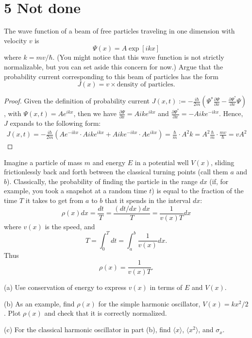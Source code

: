 \documentclass{article}
\begin{document}
\newpage

\section{5 Not done}
\begin{ques}\label{q5}
The wave function of a beam of free particles traveling in one dimension with velocity $v$ is
\[
\Psi(x) = A \exp [ikx]
\]
where $k = mv/\hbar$. (You might notice that this wave function is not strictly normalizable, but
you can set aside this concern for now.) Argue that the probability current corresponding
to this beam of particles has the form
\[
J(x) = v \times \text{density of particles}.
\]
\end{ques}

\begin{proof}
    Given the definition of probability current $J(x,t):=-\frac{i\hbar}{2m}\left(\Psi^*\frac{\partial \Psi}{\partial x}-\frac{\partial \Psi^*}{\partial x}\Psi\right)$, with $\Psi(x,t)=Ae^{ikx}$, then we have $\frac{\partial \Psi}{\partial x}=Aike^{ikx}$ and $\frac{\partial \Psi^*}{\partial x}=-Aike^{-ikx}$. Hence, $J$ expands to the following form:
    \begin{align}
        J(x,t)=-\frac{i\hbar}{2m}\left(Ae^{-ikx}\cdot Aike^{ikx}+Aike^{-ikx}\cdot Ae^{ikx}\right) = \frac{\hbar}{m}\cdot A^2k=A^2\frac{\hbar}{m}\cdot \frac{mv}{\hbar} = vA^2
    \end{align}

\end{proof}

\newpage

\begin{ques}\label{q6}
Imagine a particle of mass $m$ and energy $E$ in a potential well $V (x)$, sliding frictionlessly
back and forth between the classical turning points (call them $a$ and $b$). Classically, the
probability of finding the particle in the range $dx$ (if, for example, you took a snapshot at
a random time $t$) is equal to the fraction of the time $T$ it takes to get from $a$ to $b$ that it
spends in the interval $dx$:
\[
\rho(x)dx = \frac{dt}{T} = \frac{(dt/dx)dx}{T} = \frac{1}{v(x)T} dx
\]
where $v(x)$ is the speed, and
\[
T = \int_0^T dt = \int_a^b \frac{1}{v(x)} dx .
\]
Thus
\[
\rho(x) = \frac{1}{v(x)T}.
\]

(a) Use conservation of energy to express $v(x)$ in terms of $E$ and $V(x)$.

(b) As an example, find $\rho(x)$ for the simple harmonic oscillator, $V(x) = kx^2/2$. Plot $\rho(x)$
and check that it is correctly normalized.

(c) For the classical harmonic oscillator in part (b), find $\langle x\rangle$, $\langle x^2\rangle$, and $\sigma_x$.
\end{ques}
\end{document}
